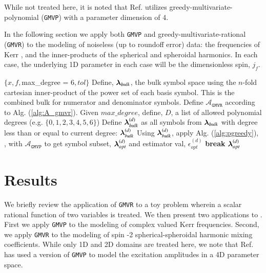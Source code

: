 \documentclass[twocolumn,aps,prd,floatfix,preprintnumbers,a4paper,nofootinbib,
superscriptaddress,10pt]{revtex4-1}
\def\jf{j_f}
\def\gmvp#1{greedy-multivariate-polynomial#1
  (\texttt{GMVP}#1)\gdef\gmvp{\texttt{GMVP}}}
\def\gmvr#1{greedy-multivariate-rational#1
  (\texttt{GMVR}#1)\gdef\gmvr{\texttt{GMVR}}}
\begin{document}
%
\par While not treated here, it is noted that Ref. \cite{London:2018gaq} utilizes \gmvp{} with a parameter dimension of 4.
%
\par In the following section we apply both \gmvp{} and \gmvr{} to the modeling of noiseless (up to roundoff error) data: the \qnm{} frequencies of Kerr , and the inner-products of the spherical and spheroidal harmonics.
%
In each case, the underlying 1D parameter in each case will be the dimensionless \bh{} spin, $\jf{}$.
%
\hspace{1cm}
{\scriptsize
\begin{algorithm}[H]
  \caption{\gmvr{}, a degree tempered stepwise algorithm for multivariate rational modeling of scalar data.}
  \label{alg:gmvr}
  \begin{algorithmic}[1]
     $ \{ x, f, $max\_degree = 6$, tol \}$
    \vskip 10pt
    \State Define, ${\bm{\lambda}}_{bulk}$, the bulk symbol space using the $n$-fold cartesian inner-product of the power set of each basis symbol. This is the combined bulk for numerator and denominator symbols.
    \State Define $\mathcal{A}_{\gmvr{}}$ according to Alg. (\ref{alg:A_gmvr}).
    \State Given $max\_degree$, define, ${ D}$, a list of allowed polynomial degrees (e.g. $\{0,1,2,3,4,5,6\}$)
      \State Define ${\bm{\lambda}}_{bulk}^{(d)}$ as all symbols from ${\bm{\lambda}}_{bulk}$ with degree less than or equal to current degree: ${\bm{\lambda}}^{(d)}_{bulk}$
      \State Using ${\bm{\lambda}}_{bulk}^{(d)}$, apply Alg. (\ref{alg:pgreedy}), \pgreedy{}, with $\mathcal{A}_{\gmvp{}}$ to get symbol subset, ${\bm{\lambda}}^{(d)}_{opt}$ and estimator val, $\epsilon^{(d)}_{opt}$
        \State \textbf{break}
      \EndIf
    \EndFor
    \vskip 10pt
     ${\bm{\lambda}}^{(d)}_{opt}$
  \end{algorithmic}
\end{algorithm}
}
%
%
\section{Results}
\label{results}
%
\par We briefly review the application of \gmvr{} to a toy problem wherein a scalar rational function of two variables is treated.
%
%
%
We then present two applications to .
%
First we apply \gmvp{} to the modeling of complex valued Kerr \qnm{} frequencies.
%
Second, we apply \gmvr{} to the modeling of spin -2 spherical-spheroidal harmonic mixing coefficients.
%
While only 1D and 2D domains are treated here, we note that Ref. \cite{London:2018gaq} has used a version of \gmvp{} to model the \qnm{} excitation amplitudes in a 4D parameter space.
%
\end{document}

